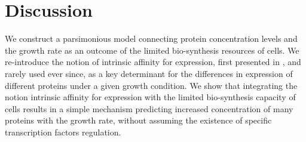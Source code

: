 \section{Discussion}
We construct a parsimonious model connecting protein concentration levels and the growth rate as an outcome of the limited bio-synthesis resources of cells. 
We re-introduce the notion of intrinsic affinity for expression, first presented in \cite{Maaloe1969}, and rarely used ever since, as a key determinant for the differences in expression of different proteins under a given growth condition.
We show that integrating the notion intrinsic affinity for expression with the limited bio-synthesis capacity of cells results in a simple mechanism predicting increased concentration of many proteins with the growth rate, without assuming the existence of specific transcription factors regulation.